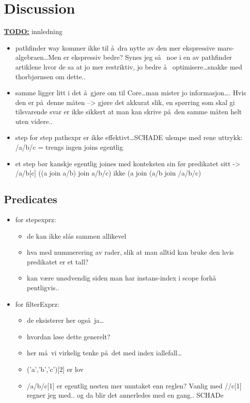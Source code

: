 \chapter{Discussion}
\label{chapter:discussion}

\textbf{\underline{\LARGE TODO:}} innledning

\begin{itemize}
  \item pathfinder way kommer ikke til \aa~dra nytte av den mer ekspressive
  mars-algebraen\ldots Men er ekspressiv bedre? Synes jeg s\aa~ noe i en av
  pathfinder artiklene hvor de sa at jo mer restriktiv, jo bedre \aa~
  optimisere\ldots snakke med thorbj\o rnsen om dette..
  \item samme ligger litt i det \aa~gj\o re om til Core\ldots man mister jo
  informasjon\ldots. Hvis den er p\aa~denne m\aa ten --> gj\o re det akkurat
  slik, en sp\o rring som skal gi tilsvarende svar er ikke sikkert at man kan
  skrive p\aa~den samme m\aa ten helt uten videre..
	\item step for step pathexpr er ikke effektivt\ldots SCHADE ulempe med rene
			uttrykk: /a/b/c = trengs ingen joins egentlig
	\item et step b\o r kanskje egentlig joines med konteksten sin f\o r predikatet
		sitt -> /a/b[c] ((a join a/b) join a/b/c) ikke (a join (a/b join /a/b/c)
\end{itemize}






\section{Predicates}
\label{sect:discussion:predicates}
\begin{itemize}
  \item for stepexprz: 

	\begin{itemize}
	  \item de kan ikke sl\aa s sammen allikevel
	  \item hva med nummerering av rader, slik at man alltid kan bruke den hvis
	  predikatet er et tall?
	  \item kan v\ae re un\o dvendig siden man har instans-index i scope forh\aa
	  pentligvis..
    \end{itemize}
  \item for filterExprz:
  	\begin{itemize}
	  \item de eksisterer her ogs\aa~ja\ldots
	  \item hvordan l\o se dette generelt?
	  \item her m\aa~vi virkelig tenke p\aa~det med index iallefall\ldots 
	  \item ('a','b','c')[2] er lov
	  \item /a/b/c[1] er egentlig nesten mer unntaket enn reglen? Vanlig med
	  //c[1] regner jeg med.. og da blir det annerledes med en gang.. SCHADe
    \end{itemize} 
\end{itemize}

